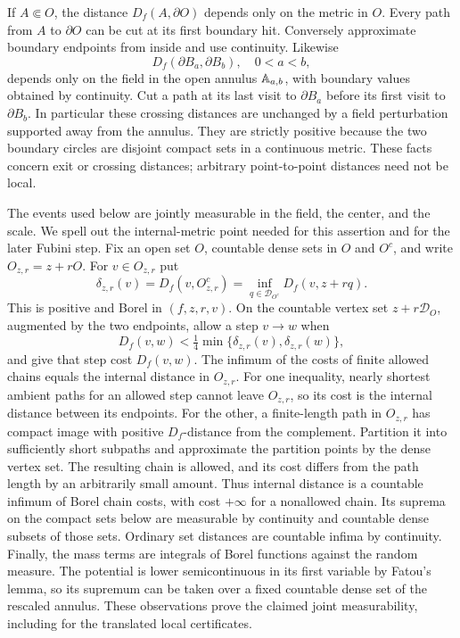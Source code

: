 \documentclass[12pt]{amsart}
\numberwithin{equation}{section}
\begin{document}
If $A\Subset O$, the distance $D_f(A,\partial O)$ depends only
on the metric in $O$. Every path from $A$ to $\partial O$ can
be cut at its first boundary hit. Conversely approximate
boundary endpoints from inside and use continuity. Likewise
\[
 D_f(\partial B_a,\partial B_b),\quad 0<a<b,
\]
depends only on the field in the open annulus $\mathbb{A}_{a,b}$, with
boundary values obtained by continuity. Cut a path at its last
visit to $\partial B_a$ before its first visit to $\partial B_b$.
In particular these crossing distances are unchanged by a field
perturbation supported away from the annulus. They are strictly
positive because the two boundary circles are disjoint compact
sets in a continuous metric.
These facts concern exit or crossing distances; arbitrary
point-to-point distances need not be local.

The events used below are jointly measurable in the field,
the center, and the scale. We spell out the internal-metric
point needed for this assertion and for the later Fubini step.
Fix an open set $O$, countable dense sets in $O$ and $O^c$,
and write $O_{z,r}=z+rO$.
For $v\in O_{z,r}$ put
\[
 \delta_{z,r}(v)=D_f(v,O_{z,r}^c)
       =\inf_{q\in\mathcal D_{O^c}}D_f(v,z+rq).
\]
This is positive and Borel in $(f,z,r,v)$.
On the countable vertex set $z+r\mathcal D_O$, augmented
by the two endpoints, allow a step $v\to w$ when
\[
 D_f(v,w)<\tfrac14
                \min\{\delta_{z,r}(v),\delta_{z,r}(w)\},
\]
and give that step cost $D_f(v,w)$.
The infimum of the costs of finite allowed chains equals
the internal distance in $O_{z,r}$.
For one inequality, nearly shortest ambient paths for an
allowed step cannot leave $O_{z,r}$, so its cost is the
internal distance between its endpoints.
For the other, a finite-length path in $O_{z,r}$ has compact
image with positive $D_f$-distance from the complement.
Partition it into sufficiently short subpaths and approximate
the partition points by the dense vertex set.
The resulting chain is allowed, and its cost differs from
the path length by an arbitrarily small amount.
Thus internal distance is a countable infimum of Borel
chain costs, with cost $+\infty$ for a nonallowed chain.
Its suprema on the compact sets below are measurable by
continuity and countable dense subsets of those sets.
Ordinary set distances are countable infima by continuity.
Finally, the mass terms are integrals of Borel functions
against the random measure. The potential is lower
semicontinuous in its first variable by Fatou's lemma,
so its supremum can be taken over a fixed countable dense
set of the rescaled annulus. These observations prove the
claimed joint measurability, including for the translated
local certificates.
\end{document}
